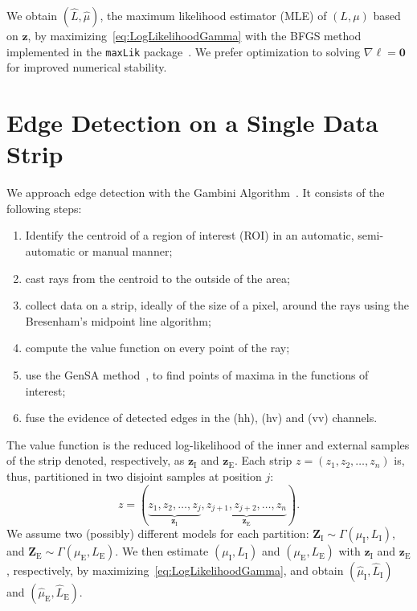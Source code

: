 \documentclass[journal]{IEEEtran}
\begin{document}
We obtain $(\widehat L, \widehat \mu)$, the maximum likelihood estimator (MLE) of $(L, \mu)$ based on $\bm z$, by maximizing~\eqref{eq:LogLikelihoodGamma} with the BFGS method implemented in the \texttt{maxLik} package~\cite{ht}.
We prefer optimization to solving $\nabla\ell=\bm 0$ for improved numerical stability.

\section{Edge Detection on a Single Data Strip}\label{sec_03}

We approach edge detection with the Gambini Algorithm~\cite{gmbf, fbgm, nhfc}.
It consists of the following steps:
\begin{enumerate}
	\item Identify the centroid of a region of interest (ROI) in an automatic, semi-automatic or manual manner;
	\item cast rays from the centroid to the outside of the area;
	\item collect data on a strip, ideally of the size of a pixel, around the rays using the  Bresenham's midpoint line algorithm;
	\item compute the value function on every point of the ray;
	\item use the GenSA method~\cite{xgsh}, to find points of maxima in the functions of interest;
	\item fuse the evidence of detected edges in the (hh), (hv) and (vv) channels.
\end{enumerate}

The value function is the reduced log-likelihood of the inner and external samples of the strip denoted, respectively, as $\bm z_\text{I}$ and $\bm z_\text{E}$.
Each strip $z = (z_1,z_2,\dots,z_n)$ is, thus, partitioned in two disjoint samples at position $j$:
$$
z = (\underbrace{z_1,z_2,\dots,z_j}_{\bm z_\text{I}}, 
\underbrace{z_{j+1}, z_{j+2},\dots,z_n}_{\bm z_\text{E}}).
$$
We assume two (possibly) different models for each partition:
$\bm Z_\text{I} \sim \Gamma(\mu_\text{I},L_\text{I})$, and 
$\bm Z_\text{E} \sim \Gamma(\mu_\text{E},L_\text{E})$.
We then estimate $(\mu_\text{I},L_\text{I})$ and $(\mu_\text{E},L_\text{E})$ with $\bm z_\text{I}$ and $\bm z_\text{E}$, respectively, by maximizing~\eqref{eq:LogLikelihoodGamma}, and obtain $(\widehat{\mu}_\text{I}, \widehat{L}_\text{I})$ and $(\widehat{\mu}_\text{E}, \widehat{L}_\text{E})$.
\end{document}
